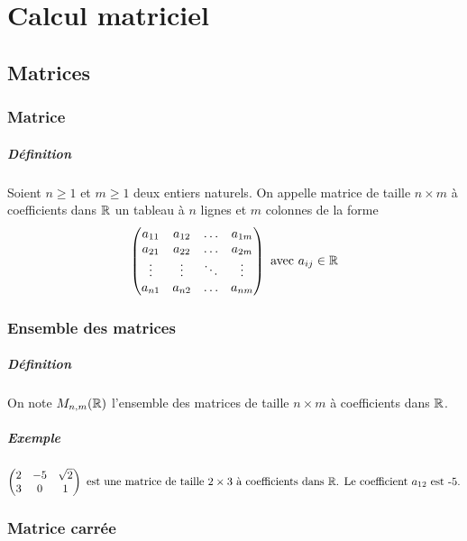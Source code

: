\chapter{Calcul matriciel}

%
%
\section{Matrices}
%
%

%
\subsection{Matrice}
%
\paragraph{Définition} Soient $n \geq 1$ et $m \geq 1$ deux entiers naturels. On appelle matrice de taille $n\times m$ à coefficients dans $\mathbb{R}$ un tableau à $n$ lignes et $m$ colonnes de la forme
$$\begin{pmatrix}
  a_{11} & a_{12} & \ldots & a_{1m} \\
  a_{21} & a_{22} & \ldots & a_{2m} \\
  \vdots & \vdots & \ddots & \vdots \\
  a_{n1} & a_{n2} & \ldots & a_{nm}
\end{pmatrix} \text{ avec } a_{ij} \in \mathbb{R}$$

%
\subsection{Ensemble des matrices}
%
\paragraph{Définition} On note $M_{n, m}(\mathbb{R})$ l'ensemble des matrices de taille $n\times m$ à coefficients dans $\mathbb{R}$.

\paragraph{Exemple}
$$\begin{pmatrix}
  2 & -5 & \sqrt{2} \\
 3 &0 & 1 \\
\end{pmatrix}\text{ est une matrice de taille $2\times 3$ à coefficients dans $\mathbb{R}$. Le coefficient $a_{12}$ est -5.}$$

%
\subsection{Matrice carrée}
%
